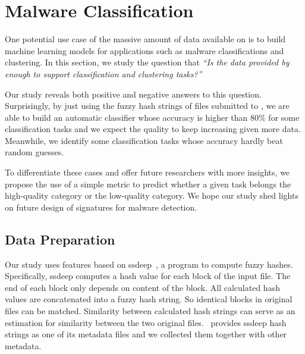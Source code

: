 \section{Malware Classification}
\label{sec:ssdeep}

One potential use case of the massive amount of data 
available on \vt{} is to build 
machine learning models for applications
such as malware classifications and
clustering. In this section, we study
the question that {\em ``Is the data
provided by \vt{} enough to support
classification and clustering tasks?''}

Our study reveals both positive and
negative answers to this question.
Surprisingly, by just using the fuzzy hash strings of files submitted to \vt{},
we are able to build an automatic classifier whose
accuracy is higher than 80\% for some classification tasks
and we expect the quality to keep increasing
given more data.
Meanwhile, we identify some classification tasks
whose accuracy hardly beat random guesses.

To differentiate these cases and offer future researchers with more insights, 
we propose the use of a simple metric to predict whether a given task belongs
the high-quality category or the low-quality
category. We hope our study shed lights
on future design of signatures for malware
detection.



\subsection{Data Preparation}



Our study uses features based on ssdeep~\cite{ssdeep}, a program to compute fuzzy hashes. 
Specifically, ssdeep computes a hash value for each block of the input file.
The end of each block only depends on content of the block. 
All calculated hash values are concatenated into a fuzzy hash string. 
So identical blocks in original files can be matched.  
Similarity between calculated hash strings can serve as an estimation for similarity between the two original files. 
\vt\ provides ssdeep hash strings as one of its metadata files and we collected them together with other metadata.

